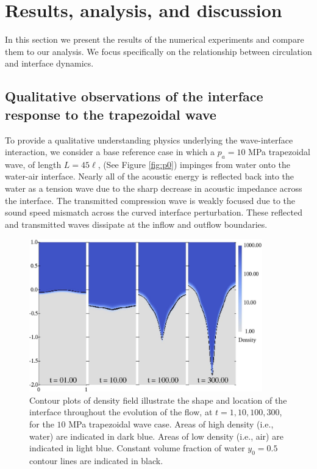 \section{Results, analysis, and discussion}%
\label{sec:results}%
% 
In this section we present the results of the numerical experiments
and compare them to our analysis. We focus specifically on the
relationship between circulation and interface dynamics.
% 
% 
\subsection{Qualitative observations of the interface response to the trapezoidal wave}
\label{subsec:Qualitative}
To provide a qualitative understanding physics underlying the
wave-interface interaction, we consider a base reference case in which
a $p_a=10$ MPa trapezoidal wave, of length $L=45\ell$, (See Figure
\ref{fig:p0}) impinges from water onto the water-air interface. Nearly
all of the acoustic energy is reflected back into the water as a
tension wave due to the sharp decrease in acoustic impedance across
the interface. The transmitted compression wave is weakly focused due
to the sound speed mismatch across the curved interface
perturbation. These reflected and transmitted waves dissipate at the
inflow and outflow boundaries.
% 
\begin{figure}[h] 
  \centering
  \includegraphics[width=0.9\textwidth]{./figs/lung_figs/snapshots_density_t1}
  \caption[The evolution of the acoustically perturbed interface]
  {Contour plots of density field illustrate the shape and location of
    the interface throughout the evolution of the flow, at
    $t=1, 10, 100, 300$, for the $10$ MPa trapezoidal wave case. Areas
    of high density (i.e., water) are indicated in dark blue. Areas of
    low density (i.e., air) are indicated in light blue. Constant volume
    fraction of water $y_0 = 0.5$ contour lines are indicated in black.}
  \label{fig:interface_snapshots}
\end{figure}
